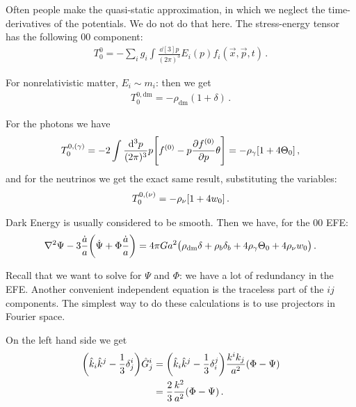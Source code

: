 \documentclass[main.tex]{subfiles}
\begin{document}
Often people make the quasi-static approximation, in which we neglect the time-derivatives of the potentials. We do not do that here. 
The stress-energy tensor has the following 00 component: 
%
\begin{align}
T^{0}_{0} = - \sum _{i} g_i \int  \frac{ \dd[3]{p}}{(2 \pi )^3} E_i (p) f_i (\vec{x}, \vec{p} ,t)
\,.
\end{align}

For nonrelativistic matter, \(E_i \sim m_i\): then we get 
%
\begin{align}
T^{0, \text{dm}}_{0} = - \rho_{\text{dm}} (1 + \delta )
\,.
\end{align}

For the photons we have 
%
\begin{align}
T^{0,(\gamma )}_{0} = 
-2 \int \frac{\dd[3]{p}}{(2 \pi )^3} p \qty[f^{(0)} - p \pdv{f^{(0)}}{p} \theta ] 
= - \rho_{\gamma } \qty[ 1 + 4 \Theta_0 ]
\,,
\end{align}
%
and for the neutrinos we get the exact same result, substituting the variables: 
%
\begin{align}
T_{0}^{0, (\nu )} = - \rho_{\nu } \qty[1 + 4 w_0 ]
\,.
\end{align}

Dark Energy is usually considered to be smooth. Then we have, for the 00 EFE: 
%
\begin{align} \label{eq:einstein-00-perturbed-equation}
\nabla^2 \Psi - 3 \frac{\dot{a}}{a} \qty(\dot{\Psi} + \Phi \frac{\dot{a}}{a }) = 4 \pi G a^2 \qty(
\rho_{\text{dm}} \delta + \rho_{b} \delta_{b} + 4 \rho_{\gamma } \Theta_0 + 4 \rho_{\nu } w_0 
)
\,.
\end{align}

Recall that we want to solve for \(\Psi \) and \(\Phi \): we have a lot of redundancy in the EFE. 
Another convenient independent equation is the traceless part of the \(ij\) components. 
The simplest way to do these calculations is to use projectors in Fourier space.

On the left hand side we get 
%
\begin{subequations}
\begin{align}
\qty(\hat{k}_{i} \hat{k}^{j} - \frac{1}{3} \delta^{i}_{j}) \hat{G}^{i}_{j} &= \qty(\hat{k}_{i} \hat{k}^{j} - \frac{1}{3} \delta_{i}^{j}) 
\frac{k^{i}k_{j}}{a^2} \qty(\Phi - \Psi )  \\
&= \frac{2}{3} \frac{k^2}{a^2} \qty(\Phi- \Psi )
\,.
\end{align}
\end{subequations}
\end{document}
